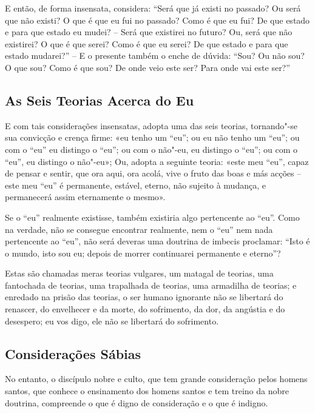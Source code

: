 E então, de forma insensata, considera: “Será que já existi no passado? Ou será
que não existi? O que é que eu fui no passado? Como é que eu fui? De que estado
e para que estado eu mudei? -- Será que existirei no futuro? Ou, será que não
existirei? O que é que serei? Como é que eu serei? De que estado e para que
estado mudarei?” -- E o presente também o enche de dúvida: “Sou? Ou não sou? O
que sou? Como é que sou? De onde veio este ser? Para onde vai este ser?”

\subsection{As Seis Teorias Acerca do Eu}

E com tais considerações insensatas, adopta uma das seis teorias, tornando"-se
sua convicção e crença firme: «eu tenho um “eu”; ou eu não tenho um “eu”;
ou com o “eu” eu distingo o “eu”; ou com o não"-eu, eu distingo o “eu”;
ou com o “eu”, eu distingo o não"-eu»; Ou, adopta a seguinte teoria: «este meu
“eu”, capaz de pensar e sentir, que ora aqui, ora acolá, vive o fruto das boas
e más acções -- este meu “eu” é permanente, estável, eterno, não sujeito à
mudança, e permanecerá assim eternamente o mesmo».


Se o “eu” realmente existisse, também existiria algo pertencente ao “eu”.
Como na verdade, não se consegue encontrar realmente, nem o “eu” nem nada
pertencente ao “eu”, não será deveras uma doutrina de imbecis proclamar:
“Isto é o mundo, isto sou eu; depois de morrer continuarei permanente e
eterno”?


Estas são chamadas meras teorias vulgares, um matagal de teorias, uma fantochada
de teorias, uma trapalhada de teorias, uma armadilha de teorias; e enredado na
prisão das teorias, o ser humano ignorante não se libertará do renascer, do
envelhecer e da morte, do sofrimento, da dor, da angústia e do desespero; eu
vos digo, ele não se libertará do sofrimento.

\clearpage

\subsection{Considerações Sábias}

No entanto, o discípulo nobre e culto, que tem grande consideração pelos homens
santos, que conhece o ensinamento dos homens santos e tem treino da nobre
doutrina, compreende o que é digno de consideração e o que é indigno.

